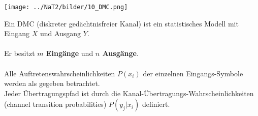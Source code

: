 \begin{minipage}{9.5cm}
	\begin{center}
		\texttt{[image: ../NaT2/bilder/10\_DMC.png]}
	\end{center}
\end{minipage}
\begin{minipage}{8.5cm}
	Ein DMC (diskreter gedächtnisfreier Kanal) ist ein statistisches Modell mit Eingang $X$ und
	Ausgang $Y$. \\ \\
	Er besitzt \textbf{$m$ Eingänge} und \textbf{$n$ Ausgänge}. \\ \\
	Alle Auftretenswahrscheinlichkeiten $P(x_i)$ der einzelnen Eingangs-Symbole werden als gegeben
	betrachtet. \\
	Jeder Übertragungspfad ist durch die Kanal-Übertragungs-Wahrscheinlichkeiten (channel transition
	probabilities) $P(y_j | x_i)$ definiert.
\end{minipage}

